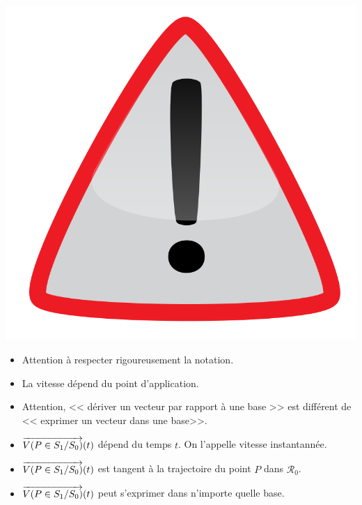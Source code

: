 \documentclass[10pt,oneside]{article}
\begin{document}
\begin{warn}
\begin{minipage}[c]{.15\linewidth}
\begin{center}
\includegraphics[width=.8\textwidth]{png/warning3}
\end{center}
\end{minipage} \hfill
\begin{minipage}[c]{.8\linewidth}
\begin{itemize}
\item Attention à respecter rigoureusement la notation.
\item La vitesse dépend du point d'application.
\item Attention, << dériver un vecteur par rapport à une base >> est différent de << exprimer un vecteur dans une base>>.
\end{itemize}
\end{minipage}
\end{warn}


\begin{rem}
\begin{itemize}
\item $\overrightarrow{V(P\in S_1/S_0)}(t)$ dépend du temps $t$. On l'appelle vitesse instantannée. 
\item $\overrightarrow{V(P\in S_1/S_0)}(t)$ est tangent à la trajectoire du point $P$ dans $\mathcal{R}_0$.
\item $\overrightarrow{V(P\in S_1/S_0)}(t)$ peut s'exprimer dans n'importe quelle base.
\end{itemize}
\end{rem}
\end{document}

